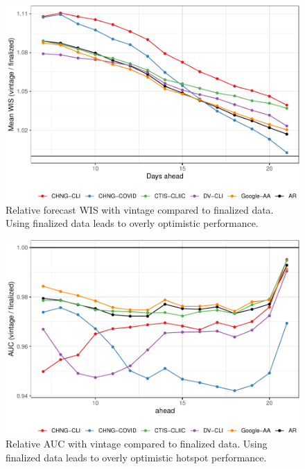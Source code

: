 \documentclass[9pt,twoside,lineno]{pnas-new}
\begin{document}
\clearpage

\begin{figure}

{\centering \includegraphics[width=\textwidth]{fig/fcast-honest-v-finalized-1} 

}

\caption{Relative forecast WIS with vintage compared to finalized data. Using finalized data leads to overly optimistic performance.}\label{fig:fcast-honest-v-finalized}
\end{figure}

\clearpage

\begin{figure}

{\centering \includegraphics[width=\textwidth]{fig/hot-honest-v-finalized-1} 

}

\caption{Relative AUC with vintage compared to finalized data. Using finalized data leads to overly optimistic hotspot performance.}\label{fig:hot-honest-v-finalized}
\end{figure}
\end{document}
